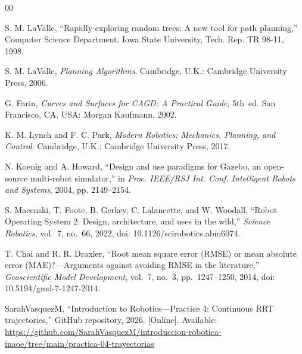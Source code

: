 \documentclass[conference]{IEEEtran}
\begin{document}
\begin{thebibliography}{00}

S. M. LaValle, ``Rapidly-exploring random trees: A new tool for path planning,''
Computer Science Department, Iowa State University, Tech. Rep. TR 98-11, 1998.

S. M. LaValle, \emph{Planning Algorithms}. Cambridge, U.K.: Cambridge
University Press, 2006.

G. Farin, \emph{Curves and Surfaces for CAGD: A Practical Guide}, 5th~ed.
San Francisco, CA, USA: Morgan Kaufmann, 2002.

K. M. Lynch and F. C. Park, \emph{Modern Robotics: Mechanics, Planning, and
Control}. Cambridge, U.K.: Cambridge University Press, 2017.

N. Koenig and A. Howard, ``Design and use paradigms for Gazebo, an open-source
multi-robot simulator,'' in \emph{Proc. IEEE/RSJ Int. Conf. Intelligent Robots
and Systems}, 2004, pp. 2149--2154.

S. Macenski, T. Foote, B. Gerkey, C. Lalancette, and W. Woodall, ``Robot
Operating System 2: Design, architecture, and uses in the wild,'' \emph{Science
Robotics}, vol.~7, no.~66, 2022, doi: 10.1126/scirobotics.abm6074.

T. Chai and R. R. Draxler, ``Root mean square error (RMSE) or mean absolute
error (MAE)?---Arguments against avoiding RMSE in the literature,''
\emph{Geoscientific Model Development}, vol.~7, no.~3, pp.~1247--1250, 2014,
doi: 10.5194/gmd-7-1247-2014.

SarahVasquezM, ``Introduction to Robotics---Practice 4: Continuous RRT
trajectories,'' GitHub repository, 2026. [Online]. Available:
\url{https://github.com/SarahVasquezM/introduccion-robotica-inaoe/tree/main/practica-04-trayectorias}

\end{thebibliography}
\end{document}
